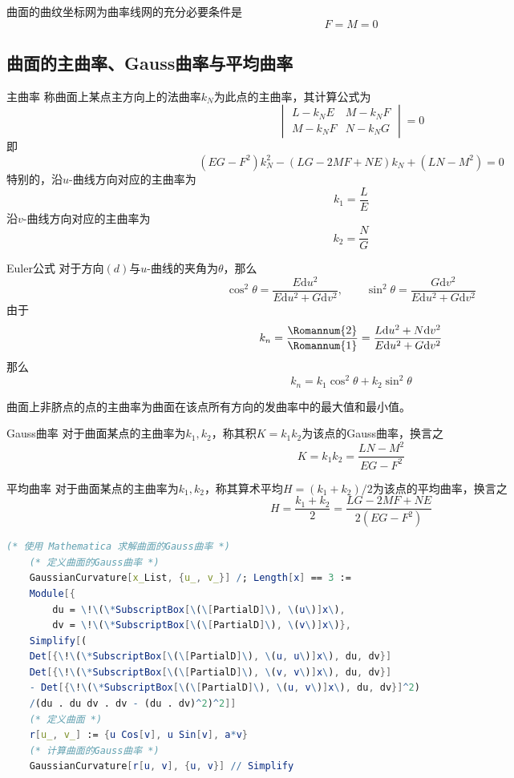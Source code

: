 \documentclass[lang = cn, scheme = chinese, thmcnt = section]{elegantbook}
\newcommand{\dd}{\mathrm{d}}           %
\begin{document}
\begin{proposition}
	曲面的曲纹坐标网为曲率线网的充分必要条件是%
	$$
	F=M=0
	$$
\end{proposition}

\subsection{曲面的主曲率、Gauss曲率与平均曲率}

\begin{definition}{主曲率}
	称曲面上某点主方向上的法曲率$k_N$为此点的主曲率，其计算公式为
	$$
	\begin{vmatrix}
		L-k_NE & M-k_NF\\
		M-k_NF & N-k_NG
	\end{vmatrix}=0
	$$
	即%
	$$
	(EG-F^2)k_N^2-(LG-2MF+NE)k_N+(LN-M^2)=0
	$$
	特别的，沿$u$-曲线方向对应的主曲率为%
	$$
	k_1=\frac{L}{E}
	$$
	沿$v$-曲线方向对应的主曲率为%
	$$
	k_2=\frac{N}{G}
	$$
\end{definition}

\begin{theorem}{Euler公式}
	对于方向$(d)$与$u$-曲线的夹角为$\theta$，那么%
	$$
	\cos^2\theta=\frac{E\dd u^2}{E\dd u^2+G\dd v^2},\qquad 
	\sin^2\theta=\frac{G\dd v^2}{E\dd u^2+G\dd v^2}
	$$
	由于%
	$$
	k_n=\frac{\rm\Romannum{2}}{\rm\Romannum{1}}=\frac{L\dd u^2+N\dd v^2}{E\dd u^2+G\dd v^2}
	$$
	那么%
	$$
	k_n=k_1\cos^2\theta+k_2\sin^2\theta
	$$
\end{theorem}

\begin{proposition}
	曲面上非脐点的点的主曲率为曲面在该点所有方向的发曲率中的最大值和最小值。
\end{proposition}

\begin{definition}{Gauss曲率}
	对于曲面某点的主曲率为$k_1,k_2$，称其积$K=k_1k_2$为该点的Gauss曲率，换言之%
	$$
	K=k_1k_2=\frac{LN-M^2}{EG-F^2}
	$$
\end{definition}

\begin{definition}{平均曲率}
	对于曲面某点的主曲率为$k_1,k_2$，称其算术平均$H=(k_1+k_2)/2$为该点的平均曲率，换言之%
	$$
	H=\frac{k_1+k_2}{2}=\frac{LG-2MF+NE}{2(EG-F^2)}
	$$
\end{definition}

\begin{lstlisting}[language = Mathematica]
	(* 使用 Mathematica 求解曲面的Gauss曲率 *)
	(* 定义曲面的Gauss曲率 *)
	GaussianCurvature[x_List, {u_, v_}] /; Length[x] == 3 := 
	Module[{
		du = \!\(\*SubscriptBox[\(\[PartialD]\), \(u\)]x\), 
		dv = \!\(\*SubscriptBox[\(\[PartialD]\), \(v\)]x\)}, 
	Simplify[(
	Det[{\!\(\*SubscriptBox[\(\[PartialD]\), \(u, u\)]x\), du, dv}] 
	Det[{\!\(\*SubscriptBox[\(\[PartialD]\), \(v, v\)]x\), du, dv}] 
	- Det[{\!\(\*SubscriptBox[\(\[PartialD]\), \(u, v\)]x\), du, dv}]^2)
	/(du . du dv . dv - (du . dv)^2)^2]]
	(* 定义曲面 *)
	r[u_, v_] := {u Cos[v], u Sin[v], a*v}
	(* 计算曲面的Gauss曲率 *)
	GaussianCurvature[r[u, v], {u, v}] // Simplify
\end{lstlisting}
\end{document}
